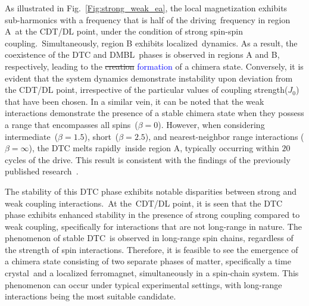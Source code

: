 \documentclass[
nofootinbib,
reprint,
superscriptaddress,
amsmath,amssymb,showkeys,
aps,
prb,
]{revtex4-2}
\newcommand{\blue}[1]{\textcolor{blue}{#1}}
\begin{document}
	As illustrated in Fig.~\ref{Fig:strong_weak_ea}, the local magnetization exhibits sub-harmonics with a frequency that is half of the driving frequency in region A at the CDT/DL point, under the condition of strong spin-spin coupling. Simultaneously, region B exhibits localized dynamics. As a result, the coexistence of the DTC and DMBL phases is observed in regions A and B, respectively, leading to the \sout{creation} \blue{formation} of a chimera state. Conversely, it is evident that the system dynamics demonstrate instability upon deviation from the CDT/DL point, irrespective of the particular values of coupling strength($J_0$) that have been chosen. In a similar vein, it can be noted that the weak interactions demonstrate the presence of a stable chimera state when they possess a range that encompasses all spins ($\beta=0$). However, when considering intermediate ($\beta = 1.5$), short ($\beta = 2.5$), and nearest-neighbor range interactions ($\beta = \infty$), the DTC melts rapidly inside region A, typically occurring within $20$ cycles of the drive. This result is consistent with the findings of the previously published research~\cite{sakurai_phys_nodate}.
	
	The stability of this DTC phase exhibits notable disparities between strong and weak coupling interactions. At the CDT/DL point, it is seen that the DTC phase exhibits enhanced stability in the presence of strong coupling compared to weak coupling, specifically for interactions that are not long-range in nature. The phenomenon of stable DTC is observed in long-range spin chains, regardless of the strength of spin interactions. Therefore, it is feasible to see the emergence of a chimera state consisting of two separate phases of matter, specifically a time crystal and a localized ferromagnet, simultaneously in a spin-chain system. This phenomenon can occur under typical experimental settings, with long-range interactions being the most suitable candidate.
	
\end{document}
